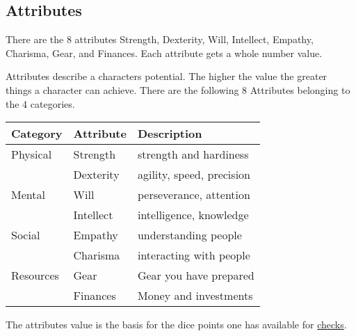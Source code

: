 \documentclass[11pt]{article}
\begin{document}
{\subsection{Attributes}
\label{sec:org6ff4736}
\begin{short}
There are the 8 attributes Strength, Dexterity, Will, Intellect, Empathy, Charisma, Gear, and Finances. Each attribute gets a whole number value.
\end{short}

Attributes describe a characters potential. The higher the value the greater things a character can achieve. There are the following 8 Attributes belonging to the 4 categories.

\begin{center}
\begin{tabular}{lll}
\textbf{Category} & \textbf{Attribute} & \textbf{Description}\\[0pt]
\hline
Physical & Strength & strength and hardiness\\[0pt]
 & Dexterity & agility, speed, precision\\[0pt]
\hline
Mental & Will & perseverance, attention\\[0pt]
 & Intellect & intelligence, knowledge\\[0pt]
\hline
Social & Empathy & understanding people\\[0pt]
 & Charisma & interacting with people\\[0pt]
\hline
Resources & Gear & Gear you have prepared\\[0pt]
 & Finances & Money and investments\\[0pt]
\end{tabular}
\end{center}

The attributes value is the basis for the dice points one has available for \hyperref[sec:orga558452]{checks}. 

}
\end{document}
